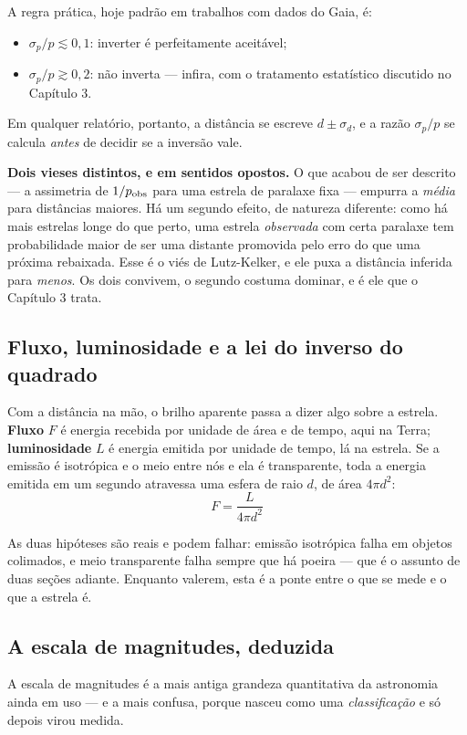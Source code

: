 \documentclass[11pt,a4paper]{article}
\begin{document}
A regra prática, hoje padrão em trabalhos com dados do Gaia, é:
\begin{itemize}
\item $\sigma_p/p\lesssim0{,}1$: inverter é perfeitamente aceitável;
\item $\sigma_p/p\gtrsim0{,}2$: não inverta --- infira, com o tratamento estatístico discutido no Capítulo 3.
\end{itemize}

Em qualquer relatório, portanto, a distância se escreve $d\pm\sigma_d$, e a razão $\sigma_p/p$ se calcula \emph{antes} de decidir se a inversão vale.

\textbf{Dois vieses distintos, e em sentidos opostos.} O que acabou de ser descrito --- a assimetria de $1/p_{\rm obs}$ para uma estrela de paralaxe fixa --- empurra a \emph{média} para distâncias maiores. Há um segundo efeito, de natureza diferente: como há mais estrelas longe do que perto, uma estrela \emph{observada} com certa paralaxe tem probabilidade maior de ser uma distante promovida pelo erro do que uma próxima rebaixada. Esse é o viés de Lutz-Kelker, e ele puxa a distância inferida para \emph{menos}. Os dois convivem, o segundo costuma dominar, e é ele que o Capítulo 3 trata.

\subsection*{Fluxo, luminosidade e a lei do inverso do quadrado}

Com a distância na mão, o brilho aparente passa a dizer algo sobre a estrela. \textbf{Fluxo} $F$ é energia recebida por unidade de área e de tempo, aqui na Terra; \textbf{luminosidade} $L$ é energia emitida por unidade de tempo, lá na estrela. Se a emissão é isotrópica e o meio entre nós e ela é transparente, toda a energia emitida em um segundo atravessa uma esfera de raio $d$, de área $4\pi d^{2}$:
\[
\boxed{\ F=\frac{L}{4\pi d^{2}}\ }
\]

As duas hipóteses são reais e podem falhar: emissão isotrópica falha em objetos colimados, e meio transparente falha sempre que há poeira --- que é o assunto de duas seções adiante. Enquanto valerem, esta é a ponte entre o que se mede e o que a estrela é.

\subsection*{A escala de magnitudes, deduzida}

A escala de magnitudes é a mais antiga grandeza quantitativa da astronomia ainda em uso --- e a mais confusa, porque nasceu como uma \emph{classificação} e só depois virou medida.
\end{document}
